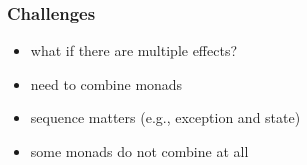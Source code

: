 \documentclass{beamer}
\begin{document}
\begin{frame}
  \frametitle{Challenges}
  \begin{itemize}[<+->]
  \item what if there are multiple effects?
  \item need to combine monads
  \item sequence matters (e.g., exception and state)
  \item some monads do not combine at all
  \end{itemize}
  
\end{frame}
\end{document}
